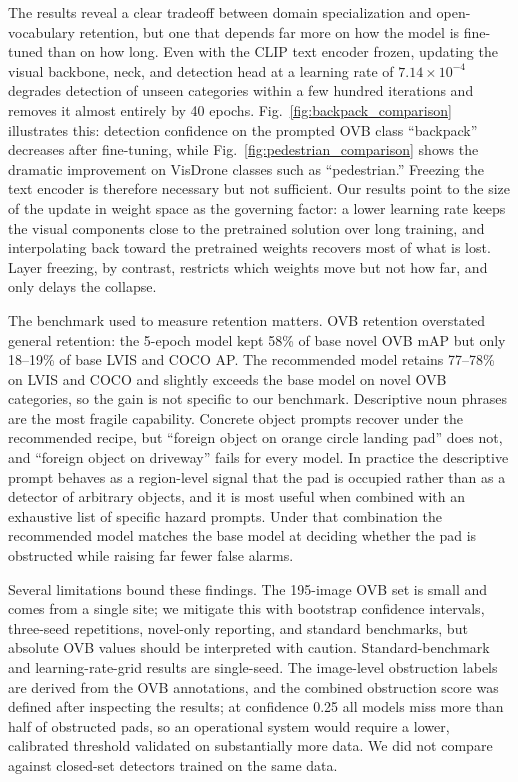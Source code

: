\documentclass[conf]{new-aiaa}
\begin{document}
The results reveal a clear tradeoff between domain specialization and open-vocabulary
retention, but one that depends far more on how the model is fine-tuned than on how long.
Even with the CLIP text encoder frozen, updating the visual backbone, neck, and detection head
at a learning rate of $7.14\times10^{-4}$ degrades detection of unseen categories within a few
hundred iterations and removes it almost entirely by 40 epochs. Fig.~\ref{fig:backpack_comparison}
illustrates this: detection confidence on the prompted OVB class ``backpack'' decreases after
fine-tuning, while Fig.~\ref{fig:pedestrian_comparison} shows the dramatic improvement on
VisDrone classes such as ``pedestrian.'' Freezing the text encoder is therefore necessary but
not sufficient. Our results point to the size of the update in weight space as the governing
factor: a lower learning rate keeps the visual components close to the pretrained solution
over long training, and interpolating back toward the pretrained weights recovers most of what
is lost. Layer freezing, by contrast, restricts which weights move but not how far, and only
delays the collapse.

The benchmark used to measure retention matters. OVB retention overstated general retention:
the 5-epoch model kept 58\% of base novel OVB mAP but only 18--19\% of base LVIS and COCO AP. The
recommended model retains 77--78\% on LVIS and COCO and slightly exceeds the base model on
novel OVB categories, so the gain is not specific to our benchmark. Descriptive noun phrases
are the most fragile capability. Concrete object prompts recover under the recommended recipe,
but ``foreign object on orange circle landing pad'' does not, and ``foreign object on
driveway'' fails for every model. In practice the descriptive prompt behaves as a region-level
signal that the pad is occupied rather than as a detector of arbitrary objects, and it is most
useful when combined with an exhaustive list of specific hazard prompts. Under that
combination the recommended model matches the base model at deciding whether the pad is
obstructed while raising far fewer false alarms.

Several limitations bound these findings. The 195-image OVB set is small and comes from a
single site; we mitigate this with bootstrap confidence intervals, three-seed repetitions,
novel-only reporting, and standard benchmarks, but absolute OVB values should be interpreted
with caution. Standard-benchmark and learning-rate-grid results are single-seed. The
image-level obstruction labels are derived from the OVB annotations, and the combined
obstruction score was defined after inspecting the results; at confidence 0.25 all models
miss more than half of obstructed pads, so an operational system would require a lower,
calibrated threshold validated on substantially more data. We did not compare against
closed-set detectors trained on the same data.
\end{document}
